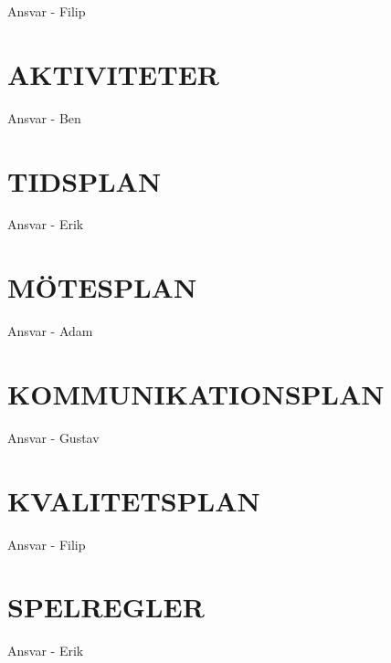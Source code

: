 \documentclass[a4paper]{article}
\begin{document}
Ansvar - Filip

\section{AKTIVITETER}
\label{sec:sktiviteter}

Ansvar - Ben

\section{TIDSPLAN}
\label{sec:tidsplan}

Ansvar - Erik

\section{MÖTESPLAN}
\label{sec:mötesplan}

Ansvar - Adam

\section{KOMMUNIKATIONSPLAN}
\label{sec:komm}

Ansvar - Gustav

\section{KVALITETSPLAN}
\label{sec:kval}

Ansvar - Filip

\section{SPELREGLER}
\label{sec:spelregler}

Ansvar - Erik

%
%
\end{document}
